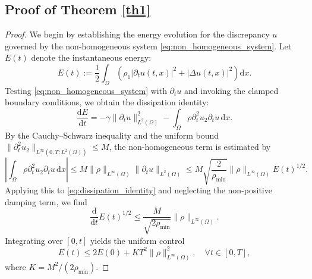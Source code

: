 \documentclass[12pt,reqno]{amsart}
\numberwithin{equation}{section}
\begin{document}
	\subsection{Proof of Theorem \ref{th1}}
	
	\begin{proof}
		We begin by establishing the energy evolution for the discrepancy $u$ governed by the non-homogeneous system \eqref{eq:non_homogeneous_system}. Let $E(t)$ denote the instantaneous energy:
		\begin{equation*}
			E(t) := \frac{1}{2} \int_\Omega \left( \rho_1 |\partial_t u(t, x)|^2 + |\Delta u(t, x)|^2 \right) \mathrm{d}x.
		\end{equation*}
		Testing \eqref{eq:non_homogeneous_system} with $\partial_t u$ and invoking the clamped boundary conditions, we obtain the dissipation identity:
		\begin{equation}\label{eq:dissipation_identity}
			\frac{\mathrm{d} E}{\mathrm{d}t} = -\gamma \|\partial_t u\|_{L^2(\Omega)}^2 - \int_\Omega \rho \partial_t^2 u_2 \partial_t u \, \mathrm{d}x.
		\end{equation}
		By the Cauchy--Schwarz inequality and the uniform bound $\|\partial_t^2 u_2\|_{L^\infty(0,T; L^2(\Omega))} \le M$, the non-homogeneous term is estimated by
		\begin{equation*}
			\left| \int_\Omega \rho \partial_t^2 u_2 \partial_t u \, \mathrm{d}x \right| \le M \|\rho\|_{L^\infty(\Omega)} \|\partial_t u\|_{L^2(\Omega)} \le M \sqrt{\frac{2}{\rho_{\min}}} \|\rho\|_{L^\infty(\Omega)} E(t)^{1/2}.
		\end{equation*}
		Applying this to \eqref{eq:dissipation_identity} and neglecting the non-positive damping term, we find 
		\[\frac{\mathrm{d}}{\mathrm{d}t} E(t)^{1/2} \le \frac{M}{\sqrt{2\rho_{\min}}} \|\rho\|_{L^\infty(\Omega)}.\]
		Integrating over $[0, t]$ yields the uniform control
		\begin{equation}\label{eq:energy_control}
			E(t) \le 2 E(0) + K T^2 \|\rho\|_{L^\infty(\Omega)}^2, \quad \forall t \in [0, T],
		\end{equation}
		where $K = M^2 / (2\rho_{\min})$. 
		

\end{proof}
\end{document}
